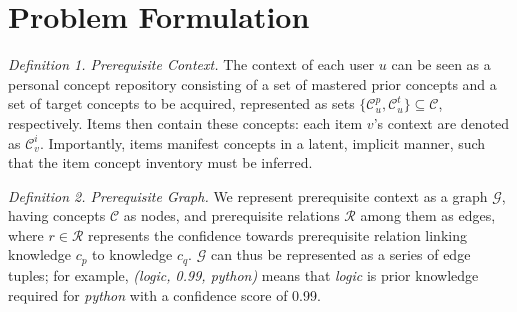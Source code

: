 \section{Problem Formulation}
\label{sec:problem_formulation}



\noindent \textit{Definition 1. Prerequisite Context.}
The context of each user $u$ can be seen as a personal concept repository consisting of a set of mastered prior concepts and a set of target concepts to be acquired, represented as sets $\{\mathcal{C}_u^p, \mathcal{C}_u^t\} \subseteq \mathcal{C}$, respectively. 
Items then contain these concepts: each item $v$'s context are denoted as $\mathcal{C}_v^i$.  Importantly, items manifest concepts in a latent, implicit manner, such that the item concept inventory must be inferred. 


\vspace{0.1cm}
\noindent \textit{Definition 2. Prerequisite Graph.} We represent prerequisite context as a graph $\mathcal{G}$, having concepts $\mathcal{C}$ as nodes, and prerequisite relations $\mathcal{R}$ among them as edges, where $r \in \mathcal{R}$ represents the confidence towards prerequisite relation linking knowledge $c_p$ to knowledge $c_q$. %
$\mathcal{G}$ can thus be represented as a series of edge tuples;
for example, \textit{(logic, 0.99, python)} means that \textit{logic} is prior knowledge required for \textit{python}
with a confidence score of 0.99.

